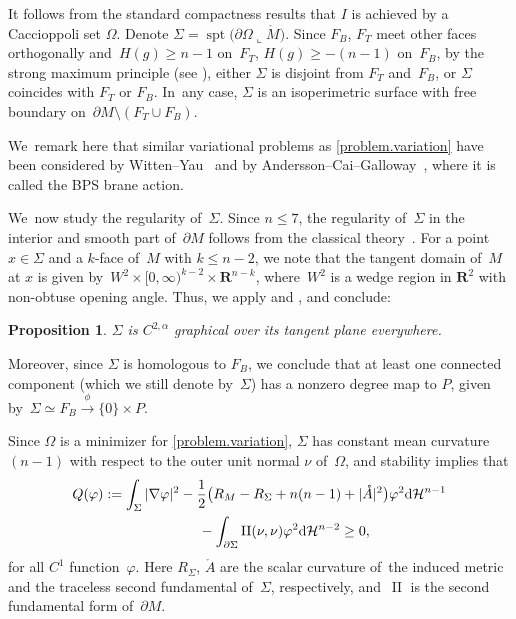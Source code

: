 \documentclass[pdftex]{sigma}
\numberwithin{equation}{section}
\newtheorem{prop}{Proposition}[section]
\theoremstyle{definition}
\newcommand{\RR}{\mathbf{R}}
\newcommand{\cH}{\mathcal H}
\DeclareMathOperator{\spt}{spt}
\DeclareMathOperator{\secondfund}{II}
\begin{document}
It follows from the standard compactness results that $I$ is achieved by a Caccioppoli set $\Omega$. Denote $\Sigma=\spt\big(\partial \Omega\llcorner \mathring{M}\big)$. Since $F_B$, $F_T$ meet other faces orthogonally and~$H(g)\ge n-1$ on~$F_T$, $H(g)\ge -(n-1)$ on~$F_B$, by the strong maximum principle (see \cite[Section~3.1]{li2019dihedral}), either $\Sigma$ is disjoint from $F_T$ and~$F_B$, or $\Sigma$ coincides with $F_T$ or $F_B$. In~any case, $\Sigma$ is an isoperimetric surface with free boundary on~$\partial M\setminus (F_T\cup F_B)$.

We~remark here that similar variational problems as \eqref{problem.variation} have been considered by Witten--Yau~\cite{WittenYau1999connectedness} and by Andersson--Cai--Galloway~\cite{AnderssonCaiGalloway2008rigidity}, where it is called the BPS brane action.

We~now study the regularity of~$\Sigma$. Since $n\le 7$, the regularity of~$\Sigma$ in the interior and smooth part of~$\partial M$ follows from the classical theory~\cite{GruterJost1986Allard, Simons1968minimal}. For a point $x\in \Sigma$ and a $k$-face of~$M$ with $k\le n-2$, we note that the tangent domain of~$M$ at $x$ is given by~$W^2\times [0,\infty)^{k-2}\times \RR^{n-k}$, where~$W^2$ is a wedge region in $\RR^2$ with non-obtuse opening angle. Thus, we apply \cite[Section~9]{EdelenLi2020regularity} and \cite[Appendix B]{li2019dihedral}, and conclude:
\begin{prop}
$\Sigma$ is $C^{2,\alpha}$ graphical over its tangent plane everywhere.
\end{prop}

Moreover, since $\Sigma$ is homologous to $F_B$, we conclude that at least one connected component (which we still denote by~$\Sigma$) has a nonzero degree map to $P$, given by~$\Sigma\simeq F_B\xrightarrow{\phi} \{0\}\times P$.

Since $\Omega$ is a minimizer for \eqref{problem.variation}, $\Sigma$ has constant mean curvature $(n-1)$ with respect to the outer unit normal $\nu$ of~$\Omega$, and stability implies that
\begin{gather}
Q(\varphi):=\int_\Sigma |\nabla \varphi|^2 -\frac{1}{2}\big(R_M-R_\Sigma + n(n-1)+|\mathring{A}|^2\big)\varphi^2 {\rm d}\cH^{n-1}\nonumber
\\ \hphantom{Q(\varphi):=}
{} -\int_{\partial \Sigma} \secondfund(\nu,\nu)\varphi^2 {\rm d}\cH^{n-2}\ge 0,
\end{gather}
for all $C^1$ function~$\varphi$. Here $R_\Sigma$, $\mathring{A}$ are the scalar curvature of~the induced metric and the traceless second fundamental of~$\Sigma$, respectively, and~$\secondfund$ is the second fundamental form of~$\partial M$.
\end{document}
